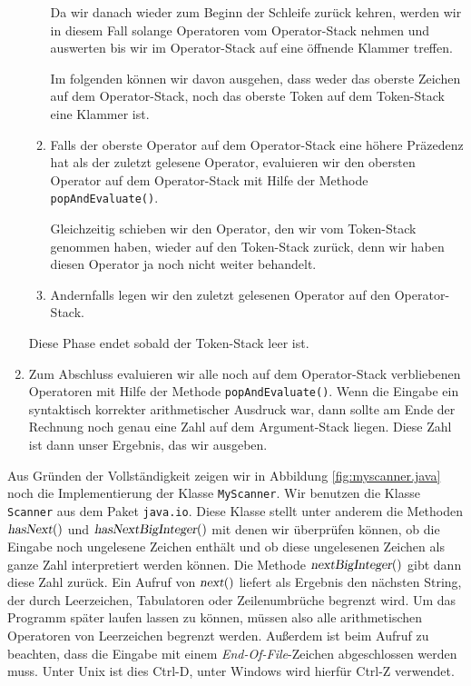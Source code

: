 \begin{enumerate}
\begin{enumerate}
            Da wir danach wieder zum Beginn der Schleife zur\"uck kehren, werden wir in
            diesem Fall solange Operatoren vom Operator-Stack nehmen und auswerten bis wir
            im Operator-Stack auf eine \"offnende Klammer treffen.

            Im folgenden k\"onnen wir davon ausgehen, dass weder das oberste Zeichen auf dem
            Operator-Stack, noch das oberste Token auf dem Token-Stack eine Klammer ist.
      \item Falls der oberste Operator auf dem Operator-Stack eine h\"ohere Pr\"azedenz hat
            als der zuletzt gelesene
            Operator,  evaluieren wir den obersten Operator auf dem
            Operator-Stack mit Hilfe der Methode \texttt{popAndEvaluate()}.

            Gleichzeitig schieben wir den Operator, den wir vom Token-Stack genommen
            haben, wieder auf den Token-Stack zur\"uck, denn wir haben diesen Operator ja
            noch nicht weiter behandelt.
      \item Andernfalls legen wir den zuletzt gelesenen Operator auf den Operator-Stack.
      \end{enumerate}
      Diese Phase endet sobald der Token-Stack leer ist.
\item Zum Abschluss evaluieren wir alle noch auf dem Operator-Stack verbliebenen Operatoren
      mit Hilfe der Methode \texttt{popAndEvaluate()}.
      Wenn die Eingabe ein syntaktisch korrekter arithmetischer Ausdruck war,
      dann sollte am Ende der Rechnung noch genau eine Zahl auf  dem Argument-Stack
      liegen.  Diese Zahl ist dann unser Ergebnis, das wir ausgeben.
\end{enumerate}
Aus Gr\"unden der Vollst\"andigkeit zeigen wir in Abbildung \ref{fig:myscanner.java}
noch die Implementierung der Klasse \texttt{MyScanner}.  Wir benutzen die Klasse
\texttt{Scanner} aus dem Paket \texttt{java.io}.  Diese Klasse stellt unter anderem die
Methoden $\textsl{hasNext}()$ und $\textsl{hasNextBigInteger}()$ mit denen wir \"uberpr\"ufen
k\"onnen, ob die Eingabe noch ungelesene Zeichen enth\"alt und ob diese ungelesenen Zeichen
als ganze Zahl interpretiert werden k\"onnen.  Die Methode $\textsl{nextBigInteger}()$ gibt
dann diese Zahl zur\"uck.  Ein Aufruf von $\textsl{next}()$ liefert als Ergebnis den
n\"achsten String, der durch Leerzeichen, Tabulatoren oder Zeilenumbr\"uche begrenzt wird.
Um das Programm sp\"ater laufen lassen zu k\"onnen, m\"ussen also alle arithmetischen Operatoren
von Leerzeichen begrenzt werden.  Au{\ss}erdem ist beim Aufruf zu beachten, dass die Eingabe mit einem
\emph{End-Of-File}-Zeichen abgeschlossen werden muss.  Unter Unix ist dies Ctrl-D, unter
Windows wird hierf\"ur Ctrl-Z verwendet.

